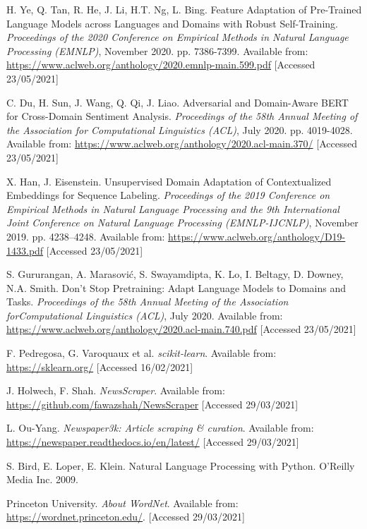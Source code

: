 \begin{thebibliography}{9}
H. Ye, Q. Tan, R. He, J. Li, H.T. Ng, L. Bing. Feature Adaptation of Pre-Trained Language Models across Languages and Domains with Robust Self-Training. \textit{Proceedings of the 2020 Conference on Empirical Methods in Natural Language Processing (EMNLP)}, November 2020. pp. 7386-7399. Available from: \url{https://www.aclweb.org/anthology/2020.emnlp-main.599.pdf} [Accessed 23/05/2021]

C. Du, H. Sun, J. Wang, Q. Qi, J. Liao. Adversarial and Domain-Aware BERT for Cross-Domain Sentiment Analysis. \textit{Proceedings of the 58th Annual Meeting of the Association for Computational Linguistics (ACL)}, July 2020. pp. 4019-4028. Available from: \url{https://www.aclweb.org/anthology/2020.acl-main.370/} [Accessed 23/05/2021]

X. Han, J. Eisenstein. Unsupervised Domain Adaptation of Contextualized Embeddings for Sequence Labeling. \textit{Proceedings of the 2019 Conference on Empirical Methods in Natural Language Processing and the 9th International Joint Conference on Natural Language Processing (EMNLP-IJCNLP)}, November 2019. pp. 4238--4248. Available from: \url{https://www.aclweb.org/anthology/D19-1433.pdf} [Accessed 23/05/2021]

S. Gururangan, A. Marasović, S. Swayamdipta, K. Lo, I. Beltagy, D. Downey, N.A. Smith. Don't Stop Pretraining: Adapt Language Models to Domains and Tasks. \textit{Proceedings of the 58th Annual Meeting of the Association forComputational Linguistics (ACL)}, July 2020. Available from: \url{https://www.aclweb.org/anthology/2020.acl-main.740.pdf} [Accessed 23/05/2021]

F. Pedregosa, G. Varoquaux et al. \textit{scikit-learn}. Available from: \url{https://sklearn.org/} [Accessed 16/02/2021]

J. Holwech, F. Shah. \textit{NewsScraper}. Available from: \url{https://github.com/fawazshah/NewsScraper} [Accessed 29/03/2021]

L. Ou-Yang. \textit{Newspaper3k: Article scraping \& curation}. Available from: \url{https://newspaper.readthedocs.io/en/latest/} [Accessed 29/03/2021]

S. Bird, E. Loper, E. Klein. Natural Language Processing with Python. O’Reilly Media Inc. 2009.

Princeton University. \textit{About WordNet}. Available from: \url{https://wordnet.princeton.edu/}. [Accessed 29/03/2021]


\end{thebibliography}
